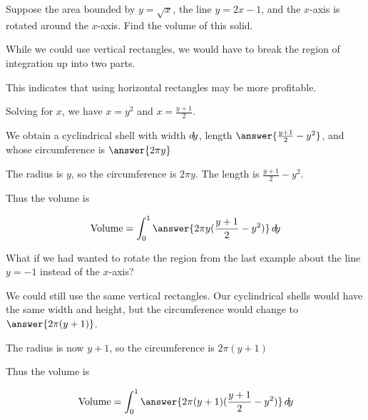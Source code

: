 \documentclass{ximera}
\begin{document}
\begin{example} 
Suppose the area bounded by $y=\sqrt{x}$, the line $y = 2x-1$, and the
$x$-axis is rotated around the $x$-axis. Find the volume of this
solid.

\begin{explanation}

\begin{image}
\end{image}

While we could use vertical rectangles, we would have to break the region of integration up into two parts.

This indicates that using horizontal rectangles may be more profitable.

Solving for $x$, we have $x = y^2$ and $x= \frac{y+1}{2}$.

We obtain a cyclindrical shell with width $\mathop{}\!d\! y$, length $\answer{\frac{y+1}{2} - y^2}$, and whose circumference is $\answer{2\pi y}$


\begin{hint}
	The radius is $y$, so the circumference is $2\pi y$.  The length is $\frac{y+1}{2} - y^2$.
\end{hint}

Thus the volume is

\[
\textrm{Volume} = \int_0^1 \answer{2\pi y (\frac{y+1}{2} - y^2)} \d y
\]
\end{explanation}
\end{example}

\begin{example}
	What if we had wanted to rotate the region from the last example about the line $y = -1$ instead of the $x$-axis?

\begin{explanation}
We could still use the same vertical rectangles.  Our cyclindrical shells would have the same width and height, but the circumference would change to $\answer{2\pi(y+1)}$.

\begin{hint}
	The radius is now $y+1$, so the circumference is $2\pi(y+1)$
\end{hint}

Thus the volume is 

\[
\textrm{Volume} = \int_0^1 \answer{2\pi (y+1) (\frac{y+1}{2} - y^2)}\d y
\]
\end{explanation}


\end{example}
\end{document}
